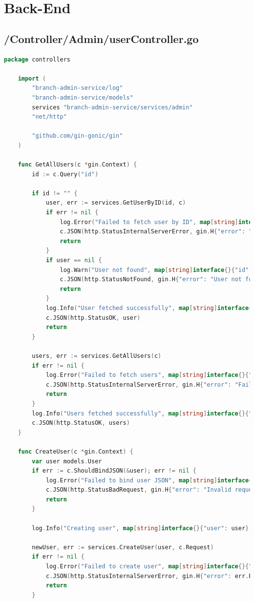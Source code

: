 \section{Back-End}

\subsection{/Controller/Admin/userController.go}
\begin{lstlisting}[language=Go, frame=single]
	package controllers

	import (
		"branch-admin-service/log"
		"branch-admin-service/models"
		services "branch-admin-service/services/admin"
		"net/http"
	
		"github.com/gin-gonic/gin"
	)
	
	func GetAllUsers(c *gin.Context) {
		id := c.Query("id")
	
		if id != "" {
			user, err := services.GetUserByID(id, c)
			if err != nil {
				log.Error("Failed to fetch user by ID", map[string]interface{}{"error": err.Error(), "id": id}, c)
				c.JSON(http.StatusInternalServerError, gin.H{"error": "Failed to fetch user"})
				return
			}
			if user == nil {
				log.Warn("User not found", map[string]interface{}{"id": id}, c)
				c.JSON(http.StatusNotFound, gin.H{"error": "User not found"})
				return
			}
			log.Info("User fetched successfully", map[string]interface{}{"id": id}, c)
			c.JSON(http.StatusOK, user)
			return
		}
	
		users, err := services.GetAllUsers(c)
		if err != nil {
			log.Error("Failed to fetch users", map[string]interface{}{"error": err.Error()}, c)
			c.JSON(http.StatusInternalServerError, gin.H{"error": "Failed to fetch users"})
			return
		}
		log.Info("Users fetched successfully", map[string]interface{}{"count": len(users)}, c)
		c.JSON(http.StatusOK, users)
	}
	
	func CreateUser(c *gin.Context) {
		var user models.User
		if err := c.ShouldBindJSON(&user); err != nil {
			log.Error("Failed to bind user JSON", map[string]interface{}{"error": err.Error()}, c)
			c.JSON(http.StatusBadRequest, gin.H{"error": "Invalid request payload"})
			return
		}
	
		log.Info("Creating user", map[string]interface{}{"user": user}, c)
	
		newUser, err := services.CreateUser(user, c.Request)
		if err != nil {
			log.Error("Failed to create user", map[string]interface{}{"user": user, "error": err.Error()}, c)
			c.JSON(http.StatusInternalServerError, gin.H{"error": err.Error()})
			return
		}
	

\end{lstlisting}
